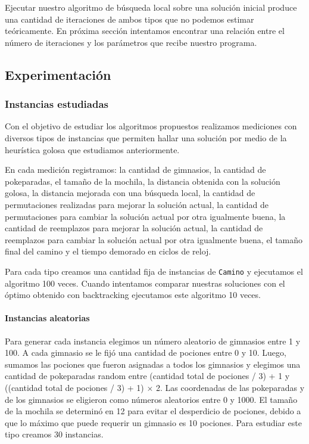 Ejecutar nuestro algoritmo de b\'usqueda local sobre una soluci\'on inicial produce una cantidad de iteraciones de ambos tipos que no podemos estimar te\'oricamente. En pr\'oxima secci\'on intentamos encontrar una relaci\'on entre el n\'umero de iteraciones y los par\'ametros que recibe nuestro programa.

\subsection{Experimentación}


\subsubsection{Instancias estudiadas}

Con el objetivo de estudiar los algoritmos propuestos realizamos mediciones con diversos tipos de instancias que permiten hallar una soluci\'on por medio de la heur\'istica golosa que estudiamos anteriormente.

En cada medici\'on registramos: la cantidad de gimnasios, la cantidad de pokeparadas, el tamaño de la mochila, la distancia obtenida con la soluci\'on golosa, la distancia mejorada con una b\'usqueda local, la cantidad de permutaciones realizadas para mejorar la soluci\'on actual, la cantidad de permutaciones para cambiar la soluci\'on actual por otra igualmente buena, la cantidad de reemplazos para mejorar la soluci\'on actual, la cantidad de reemplazos para cambiar la soluci\'on actual por otra igualmente buena, el tamaño final del camino y el tiempo demorado en ciclos de reloj.

Para cada tipo creamos una cantidad fija de instancias de \texttt{Camino} y ejecutamos el algoritmo 100 veces. Cuando intentamos comparar nuestras soluciones con el \'optimo obtenido con backtracking ejecutamos este algoritmo 10 veces.

\paragraph{Instancias aleatorias}
Para generar cada instancia elegimos un n\'umero aleatorio de gimnasios entre 1 y 100. A cada gimnasio se le fij\'o una cantidad de pociones entre 0 y 10. Luego, sumamos las pociones que fueron asignadas a todos los gimnasios y elegimos una cantidad de pokeparadas random entre (cantidad total de pociones / 3) + 1 y ((cantidad total de pociones / 3) + 1) $\times$ 2. Las coordenadas de las pokeparadas y de los gimnasios se eligieron como n\'umeros aleatorios entre 0 y 1000. El tamaño de la mochila se determin\'o en 12 para evitar el desperdicio de pociones, debido a que lo m\'aximo que puede requerir un gimnasio es 10 pociones. Para estudiar este tipo creamos 30 instancias.


